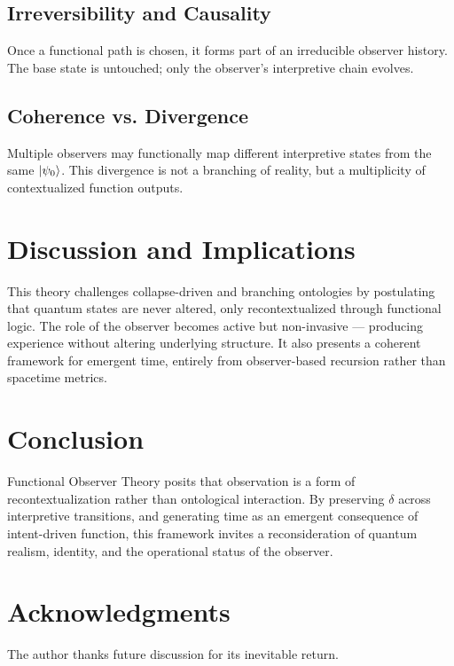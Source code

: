 \documentclass[12pt]{article}
\begin{document}
\subsection{Irreversibility and Causality}
Once a functional path is chosen, it forms part of an irreducible observer history. The base state is untouched; only the observer's interpretive chain evolves.

\subsection{Coherence vs. Divergence}
Multiple observers may functionally map different interpretive states from the same $\ket{\psi_0}$. This divergence is not a branching of reality, but a multiplicity of contextualized function outputs.

\section{Discussion and Implications}

This theory challenges collapse-driven and branching ontologies by postulating that quantum states are never altered, only recontextualized through functional logic. The role of the observer becomes active but non-invasive --- producing experience without altering underlying structure. It also presents a coherent framework for emergent time, entirely from observer-based recursion rather than spacetime metrics.

\section{Conclusion}

Functional Observer Theory posits that observation is a form of recontextualization rather than ontological interaction. By preserving $\delta$ across interpretive transitions, and generating time as an emergent consequence of intent-driven function, this framework invites a reconsideration of quantum realism, identity, and the operational status of the observer.

\section*{Acknowledgments}

The author thanks future discussion for its inevitable return.
\end{document}

